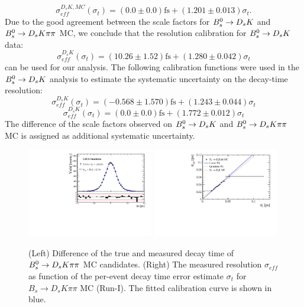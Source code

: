 \begin{equation}
\sigma_{eff}^{D_sK,MC}(\sigma_t) = \left( 0.0 \pm 0.0 \right) \text{fs} + \left( 1.201 \pm 0.013 \right) \sigma_t  .
\label{eq:scaleFactorDsKMC}
\end{equation}
Due to the good agreement between the scale factors for  ${{B}^0_{s}}\rightarrow{\ensuremath{{D}_{s}}}{\ensuremath{K}}$ and ${{B}^0_{s}}\rightarrow{\ensuremath{{D}_{s}}}{\ensuremath{K}}{\ensuremath{\pi}}{\ensuremath{\pi}}$ MC, we conclude that 
the resolution calibration for ${{B}^0_{s}}\rightarrow{\ensuremath{{D}_{s}}}{\ensuremath{K}}$ data:
\begin{equation}
\sigma_{eff}^{D_sK}(\sigma_t) = \left( 10.26 \pm 1.52 \right) \text{fs} + \left( 1.280 \pm 0.042 \right) \sigma_t
\label{eq:scaleFactorDsK}
\end{equation}
can be used for our analysis.
The following calibration functions were used in the ${{B}^0_{s}}\rightarrow{\ensuremath{{D}_{s}}}{\ensuremath{K}}$ analysis to estimate the systematic uncertainty on the decay-time resolution:
\begin{equation}
\sigma_{eff}^{D_sK}(\sigma_t) = \left( -0.568 \pm 1.570 \right) \text{fs} + \left( 1.243 \pm 0.044 \right) \sigma_t
\label{eq:scaleFactorDsK2}
\end{equation}
\begin{equation}
\sigma_{eff}^{D_sK}(\sigma_t) = \left( 0.0 \pm 0.0 \right) \text{fs} + \left( 1.772 \pm 0.012 \right) \sigma_t
\label{eq:scaleFactorDsK3}
\end{equation}
The difference of the scale factors observed on ${{B}^0_{s}}\rightarrow{\ensuremath{{D}_{s}}}{\ensuremath{K}}$ and ${{B}^0_{s}}\rightarrow{\ensuremath{{D}_{s}}}{\ensuremath{K}}{\ensuremath{\pi}}{\ensuremath{\pi}}$ MC is assigned as additional systematic uncertainty.


\begin{figure}[h]
\centering
\includegraphics[height=!,width=0.49\textwidth]{figs/Resolution/SignalMC_bin_all.pdf}
\includegraphics[height=!,width=0.49\textwidth]{figs/Resolution/ScaleFactor_MC.pdf}
\caption{ (Left) Difference of the true and measured decay time of ${{B}^0_{s}}\rightarrow{\ensuremath{{D}_{s}}}{\ensuremath{K}}{\ensuremath{\pi}}{\ensuremath{\pi}}$ MC candidates. 
(Right) The measured resolution $\sigma_{eff}$ as function of the per-event decay time error estimate $\sigma_t$ for $B_s \to D_s K \pi \pi$ MC (Run-I). 
The fitted calibration curve is shown in blue.}
\label{fig:scaleFactorMC}
\end{figure}

